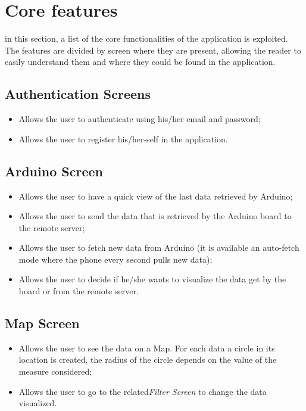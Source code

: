 \section{Core features}
in this section, a list of the core functionalities of the application is exploited. The features are divided by screen where they are present, allowing the reader to easily understand them and where they could be found in the application.

\subsection{Authentication Screens}
\begin{itemize}
    \item Allows the user to authenticate using his/her email and password;
    \item Allows the user to register his/her-self in the application.
\end{itemize}
    
\subsection{Arduino Screen}
\begin{itemize}
    \item Allows the user to have a quick view of the last data retrieved by Arduino;
    \item Allows the user to send the data that is retrieved by the Arduino board to the remote server;
    \item Allows the user to fetch new data from Arduino (it is available an auto-fetch mode where the phone every second pulls new data);
    \item Allows the user to decide if he/she wants to visualize the data get by the board or from the remote server.
\end{itemize}
    
\subsection{Map Screen}
\begin{itemize}
    \item Allows the user to see the data on a Map. For each data a circle in its location is created, the radius of the circle depends on the value of the measure considered;
    \item Allows the user to go to the related\textit{Filter Screen} to change the data visualized.
\end{itemize}
    
